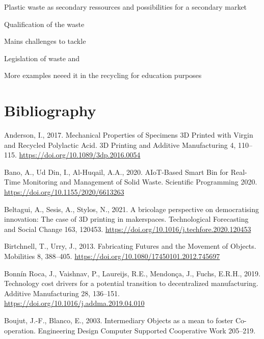 \documentclass[
  11pt,
]{article}
\newlength{\cslhangindent}
\newlength{\cslentryspacingunit} %
\newenvironment{CSLReferences}[2] %
 {%
  \setlength{\parindent}{0pt}
  \ifodd #1
  \let\oldpar\par
  \def\par{\hangindent=\cslhangindent\oldpar}
  \fi
  \setlength{\parskip}{#2\cslentryspacingunit}
 }%
 {}
\begin{document}
Plastic waste as secondary ressources and possibilities for a secondary
market

Qualification of the waste

Mains challenges to tackle

Legislation of waste and

More examples neeed it in the recycling for education purposes

\newpage

\hypertarget{bibliography}{%
\section*{Bibliography}\label{bibliography}}

\hypertarget{refs}{}
\begin{CSLReferences}{1}{0}
\leavevmode{}%
Anderson, I., 2017. Mechanical {Properties} of {Specimens 3D Printed}
with {Virgin} and {Recycled Polylactic Acid}. 3D Printing and Additive
Manufacturing 4, 110--115. \url{https://doi.org/10.1089/3dp.2016.0054}

\leavevmode{}%
Bano, A., Ud Din, I., Al-Huqail, A.A., 2020. {AIoT-Based Smart Bin} for
{Real-Time Monitoring} and {Management} of {Solid Waste}. Scientific
Programming 2020. \url{https://doi.org/10.1155/2020/6613263}

\leavevmode{}%
Beltagui, A., Sesis, A., Stylos, N., 2021. A bricolage perspective on
democratising innovation: {The} case of {3D} printing in makerspaces.
Technological Forecasting and Social Change 163, 120453.
\url{https://doi.org/10.1016/j.techfore.2020.120453}

\leavevmode{}%
Birtchnell, T., Urry, J., 2013. Fabricating {Futures} and the {Movement}
of {Objects}. Mobilities 8, 388--405.
\url{https://doi.org/10.1080/17450101.2012.745697}

\leavevmode{}%
Bonnín Roca, J., Vaishnav, P., Laureijs, R.E., Mendonça, J., Fuchs,
E.R.H., 2019. Technology cost drivers for a potential transition to
decentralized manufacturing. Additive Manufacturing 28, 136--151.
\url{https://doi.org/10.1016/j.addma.2019.04.010}

\leavevmode{}%
Boujut, J.-F., Blanco, E., 2003. Intermediary {Objects} as a mean to
foster {Co-operation}. Engineering Design Computer Supported Cooperative
Work 205--219.


\end{CSLReferences}
\end{document}
